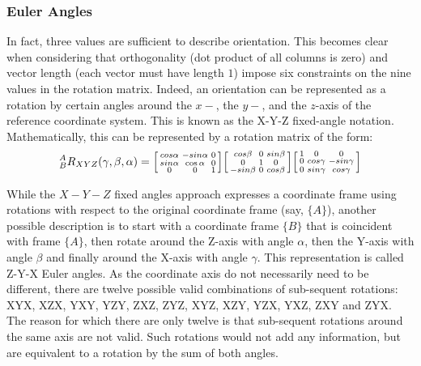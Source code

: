 \subsubsection{Euler Angles}
In fact, three values are sufficient to describe orientation.
This becomes clear when considering that orthogonality (dot product of all columns is zero) and vector length (each vector must have length $1$) impose six constraints on the nine values in the rotation matrix.
Indeed, an orientation can be represented as a rotation by certain angles around the $x-$, the $y-$, and the $z$-axis of the reference coordinate system. This is known as the X-Y-Z fixed-angle notation. Mathematically, this can be represented by a rotation matrix of the form:
\begin{equation}
^A_BR_{XYZ}(\gamma,\beta,\alpha)=\begin{bsmallmatrix}cos\alpha & -sin\alpha & 0\\sin\alpha & \cos\alpha & 0\\0 & 0 & 1\end{bsmallmatrix}\begin{bsmallmatrix}cos\beta& 0 & sin\beta\\0 & 1 & 0\\-sin\beta & 0 & cos\beta\end{bsmallmatrix}\begin{bsmallmatrix}1 & 0 & 0 \\ 0 & cos\gamma & -sin\gamma\\0 & sin\gamma & cos\gamma\end{bsmallmatrix}
\end{equation}

While the $X-Y-Z$ fixed angles approach expresses a coordinate frame using rotations with respect to the original coordinate frame (say, $\{A\}$), another possible description is to start with a coordinate frame $\{B\}$ that is coincident with frame $\{A\}$, then rotate around the Z-axis with angle $ \alpha$, then the Y-axis with angle $ \beta$ and finally around the X-axis with angle $ \gamma$. This representation is called Z-Y-X Euler angles.
As the coordinate axis do not necessarily need to be different, there are twelve possible valid combinations of sub-sequent rotations: XYX, XZX, YXY, YZY, ZXZ, ZYZ, XYZ, XZY, YZX, YXZ, ZXY and ZYX.
The reason for which there are only twelve is that sub-sequent rotations around the same axis are not valid. Such rotations would not add any information, but are equivalent to a rotation by the sum of both angles.

